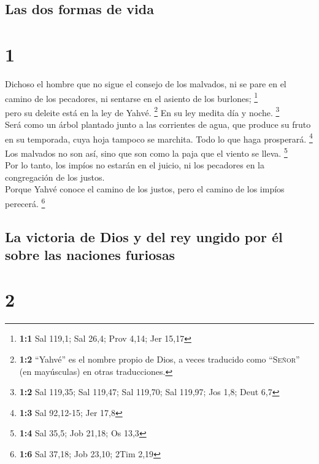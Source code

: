 \hypertarget{las-dos-formas-de-vida}{%
\subsection{Las dos formas de vida}\label{las-dos-formas-de-vida}}

\hypertarget{section}{%
\section{1}\label{section}}

 Dichoso el hombre que no sigue el consejo de los
malvados, ni se pare en el camino de los pecadores, ni sentarse en el
asiento de los burlones; \footnote{\textbf{1:1} Sal 119,1; Sal 26,4;
  Prov 4,14; Jer 15,17}\\
 pero su deleite está en la ley de Yahvé. \footnote{\textbf{1:2}
  ``Yahvé'' es el nombre propio de Dios, a veces traducido como
  ``\textsc{Señor}'' (en mayúsculas) en otras traducciones.} En su ley
medita día y noche. \footnote{\textbf{1:2} Sal 119,35; Sal 119,47; Sal
  119,70; Sal 119,97; Jos 1,8; Deut 6,7}\\
 Será como un árbol plantado junto a las corrientes de
agua, que produce su fruto en su temporada, cuya hoja tampoco se
marchita. Todo lo que haga prosperará. \footnote{\textbf{1:3} Sal
  92,12-15; Jer 17,8}\\
 Los malvados no son así, sino que son como la paja que el
viento se lleva. \footnote{\textbf{1:4} Sal 35,5; Job 21,18; Os 13,3}\\
 Por lo tanto, los impíos no estarán en el juicio, ni los
pecadores en la congregación de los justos.\\
 Porque Yahvé conoce el camino de los justos, pero el
camino de los impíos perecerá. \footnote{\textbf{1:6} Sal 37,18; Job
  23,10; 2Tim 2,19}

\hypertarget{la-victoria-de-dios-y-del-rey-ungido-por-uxe9l-sobre-las-naciones-furiosas}{%
\subsection{La victoria de Dios y del rey ungido por él sobre las
naciones
furiosas}\label{la-victoria-de-dios-y-del-rey-ungido-por-uxe9l-sobre-las-naciones-furiosas}}

\hypertarget{section-1}{%
\section{2}\label{section-1}}

